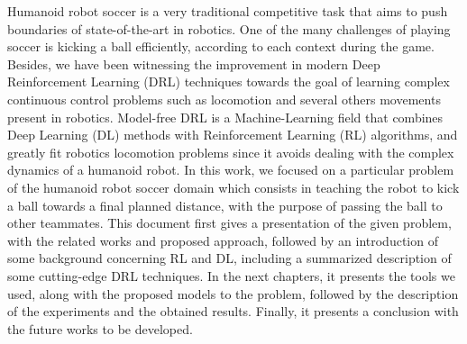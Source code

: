 
Humanoid robot soccer is a very traditional competitive task that aims to push boundaries of state-of-the-art in robotics. One of the many challenges of playing soccer is kicking a ball efficiently, according to each context during the game. Besides, we have been witnessing the improvement in modern Deep Reinforcement Learning (DRL) techniques towards the goal of learning complex continuous control problems such as locomotion and several others movements present in robotics. Model-free DRL is a Machine-Learning field that combines Deep Learning (DL) methods with Reinforcement Learning (RL) algorithms, and greatly fit robotics locomotion problems since it avoids dealing with the complex dynamics of a humanoid robot. In this work, we focused on a particular problem of the humanoid robot soccer domain which consists in teaching the robot to kick a ball towards a final planned distance, with the purpose of passing the ball to other teammates. This document first gives a presentation of the given problem, with the related works and proposed approach, followed by an introduction of some background concerning RL and DL, including a summarized description of some cutting-edge DRL techniques. In the next chapters, it presents the tools we used, along with the proposed models to the problem, followed by the description of the experiments and the obtained results. Finally, it presents a conclusion with the future works to be developed.


